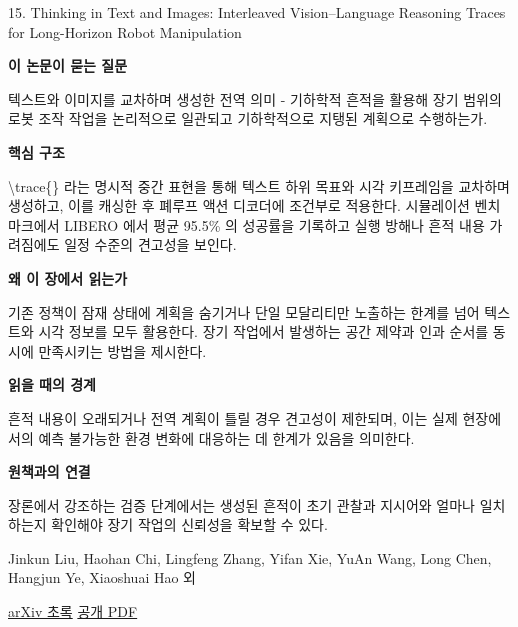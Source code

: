 \documentclass[11pt,openany]{book}
\begin{document}
\begin{termcard}{15. Thinking in Text and Images: Interleaved Vision--Language Reasoning Traces for Long-Horizon Robot Manipulation}

\par

\medskip

{\sffamily\bfseries\color{deepblue} 이 논문이 묻는 질문}\par

텍스트와 이미지를 교차하며 생성한 전역 의미 - 기하학적 흔적을 활용해 장기 범위의 로봇 조작 작업을 논리적으로 일관되고 기하학적으로 지탱된 계획으로 수행하는가.

\smallskip

{\sffamily\bfseries\color{deepblue} 핵심 구조}\par

\textbackslash{}trace\{\} 라는 명시적 중간 표현을 통해 텍스트 하위 목표와 시각 키프레임을 교차하며 생성하고, 이를 캐싱한 후 폐루프 액션 디코더에 조건부로 적용한다. 시뮬레이션 벤치마크에서 LIBERO 에서 평균 95.5\% 의 성공률을 기록하고 실행 방해나 흔적 내용 가려짐에도 일정 수준의 견고성을 보인다.

\smallskip

{\sffamily\bfseries\color{deepblue} 왜 이 장에서 읽는가}\par

기존 정책이 잠재 상태에 계획을 숨기거나 단일 모달리티만 노출하는 한계를 넘어 텍스트와 시각 정보를 모두 활용한다. 장기 작업에서 발생하는 공간 제약과 인과 순서를 동시에 만족시키는 방법을 제시한다.

\smallskip

{\sffamily\bfseries\color{coral} 읽을 때의 경계}\par

흔적 내용이 오래되거나 전역 계획이 틀릴 경우 견고성이 제한되며, 이는 실제 현장에서의 예측 불가능한 환경 변화에 대응하는 데 한계가 있음을 의미한다.

\smallskip

{\sffamily\bfseries\color{teal} 원책과의 연결}\par

장론에서 강조하는 검증 단계에서는 생성된 흔적이 초기 관찰과 지시어와 얼마나 일치하는지 확인해야 장기 작업의 신뢰성을 확보할 수 있다.

\medskip

{\footnotesize\color{muted} Jinkun Liu, Haohan Chi, Lingfeng Zhang, Yifan Xie, YuAn Wang, Long Chen, Hangjun Ye, Xiaoshuai Hao 외\par

\href{https://arxiv.org/abs/2605.00438}{arXiv 초록} \quad \href{https://arxiv.org/pdf/2605.00438}{공개 PDF}\par}

\end{termcard}
\end{document}
